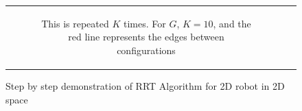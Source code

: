 \begin{figure}[H]
\begin{center}
\begin{tabular}{c c}
\begin{subfigure}{0.45\textwidth}
    \caption{This is repeated $K$ times. For $G$, $K=10$, and the red line represents the edges between configurations}
    \label{subfig:rrt-step-by-step-D}
    \end{subfigure}

\end{tabular}
    
    \caption{Step by step demonstration of \ac{RRT} Algorithm for 2D robot in 2D space}
    \label{fig:rrt-step-by-step}
\end{center}
\end{figure}